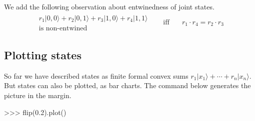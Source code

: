 \documentclass[leqno]{tufte-book} %
\newcommand{\ket}[1]{\ensuremath{|#1\rangle}}
\begin{document}
We add the following observation about entwinedness of joint states.
\begin{equation}
\label{eqn:entwined}
\begin{array}{rcl}
\begin{array}{c}
r_{1}\ket{0,0} + r_{2}\ket{0,1} + r_{3}\ket{1,0} + r_{4}\ket{1,1}
\\[-.4em]
\mbox{is non-entwined}
\end{array}
& \quad\mbox{iff}\quad &
r_{1}\cdot r_{4} = r_{2}\cdot r_{3}
\end{array}
\end{equation}


\subsection{Plotting states}\label{subsec:dplot}

So far we have described states as finite formal convex sums
$r_{1}\ket{x_1} + \cdots + r_{n}\ket{x_n}$. But states can also be
plotted, as bar charts. The command below generates the picture in the
margin.
\begin{python}
>>> flip(0.2).plot()
\end{python}
\end{document}
